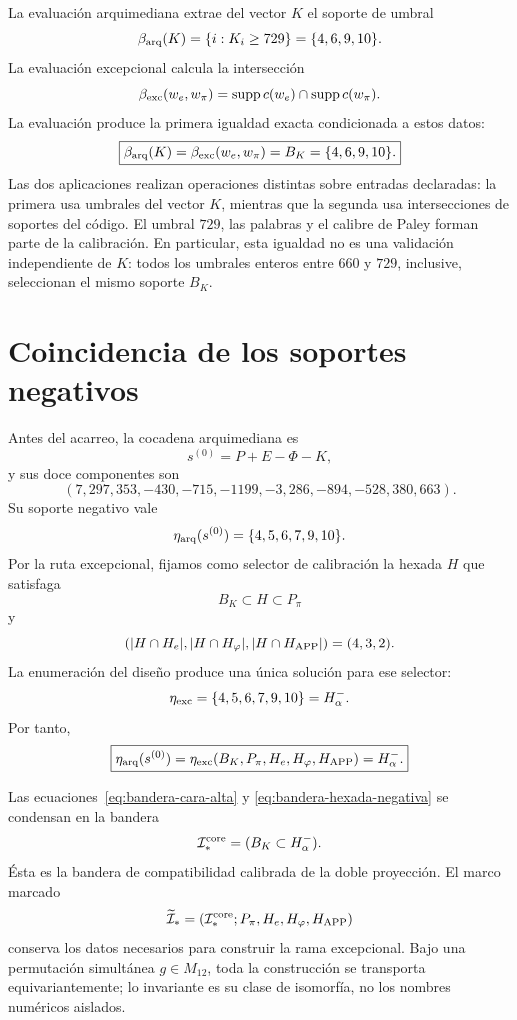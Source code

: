 La evaluación arquimediana extrae del vector \(K\) el soporte de umbral
\[
\beta_{\rm arq}(K)=\{i:K_i\ge729\}
=\{4,6,9,10\}.
\]
La evaluación excepcional calcula la intersección
\[
\beta_{\rm exc}(w_e,w_\pi)
=\operatorname{supp}c(w_e)\cap\operatorname{supp}c(w_\pi).
\]
La evaluación produce la primera igualdad exacta condicionada a estos datos:
\begin{equation}
\boxed{
\beta_{\rm arq}(K)
=\beta_{\rm exc}(w_e,w_\pi)
=B_K=\{4,6,9,10\}.}
\label{eq:bandera-cara-alta}
\end{equation}
Las dos aplicaciones realizan operaciones distintas sobre entradas
declaradas: la primera usa umbrales del vector \(K\), mientras que la segunda
usa intersecciones de soportes del código. El umbral \(729\), las palabras y
el calibre de Paley forman parte de la calibración. En particular, esta
igualdad no es una validación independiente de \(K\): todos los umbrales
enteros entre \(660\) y \(729\), inclusive, seleccionan el mismo soporte
\(B_K\).

\section{Coincidencia de los soportes negativos}

Antes del acarreo, la cocadena arquimediana es
\[
s^{(0)}=P+E-\Phi-K,
\]
y sus doce componentes son
\[
(7,297,353,-430,-715,-1199,-3,286,-894,-528,380,663).
\]
Su soporte negativo vale
\[
\eta_{\rm arq}(s^{(0)})
=\{4,5,6,7,9,10\}.
\]
Por la ruta excepcional, fijamos como selector de calibración la hexada \(H\)
que satisfaga
\[
B_K\subset H\subset P_\pi
\]
y
\[
(|H\cap H_e|,|H\cap H_\varphi|,|H\cap H_{\rm APP}|)=(4,3,2).
\]
La enumeración del diseño produce una única solución para ese selector:
\[
\eta_{\rm exc}
=\{4,5,6,7,9,10\}
=H^-_\alpha.
\]
Por tanto,
\begin{equation}
\boxed{
\eta_{\rm arq}(s^{(0)})
=\eta_{\rm exc}(B_K,P_\pi,H_e,H_\varphi,H_{\rm APP})
=H^-_\alpha.}
\label{eq:bandera-hexada-negativa}
\end{equation}

Las ecuaciones~\eqref{eq:bandera-cara-alta} y
\eqref{eq:bandera-hexada-negativa} se condensan en la bandera
\[
\mathcal I_*^{\rm core}=(B_K\subset H^-_\alpha).
\]
Ésta es la bandera de compatibilidad calibrada de la doble proyección. El marco marcado
\[
\widetilde{\mathcal I}_*
=(\mathcal I_*^{\rm core};P_\pi,H_e,H_\varphi,H_{\rm APP})
\]
conserva los datos necesarios para construir la rama excepcional. Bajo una
permutación simultánea \(g\in M_{12}\), toda la construcción se transporta
equivariantemente; lo invariante es su clase de isomorfía, no los nombres
numéricos aislados.

